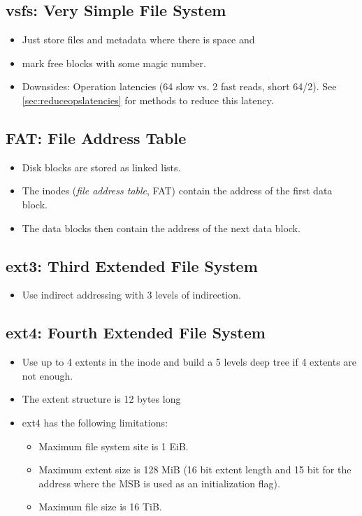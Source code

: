 	\subsection{vsfs: Very Simple File System}
		\begin{itemize}
			\item Just store files and metadata where there is space and
			\item mark free blocks with some magic number.
			\item Downsides: Operation latencies (64 slow vs. 2 fast reads, short 64/2). See \ref{sec:reduceopslatencies} for methods to reduce this latency.
		\end{itemize}

	\subsection{FAT: File Address Table}
		\begin{itemize}
			\item Disk blocks are stored as linked lists.
			\item The inodes (\textit{file address table}, FAT) contain the address of the first data block.
			\item The data blocks then contain the address of the next data block.
		\end{itemize}

	\subsection{ext3: Third Extended File System}
		\begin{itemize}
			\item Use indirect addressing with 3 levels of indirection.
		\end{itemize}


	\subsection{ext4: Fourth Extended File System}
		\begin{itemize}
			\item Use up to 4 extents in the inode and build a 5 levels deep tree if 4 extents are not enough.
			\item The extent structure is 12 bytes long
			\item ext4 has the following limitations:
				\begin{itemize}
					\item Maximum file system site is 1 EiB.
					\item Maximum extent size is 128 MiB (16 bit extent length and 15 bit for the address where the MSB is used as an initialization flag).
					\item Maximum file size is 16 TiB.
				\end{itemize}
		\end{itemize}

